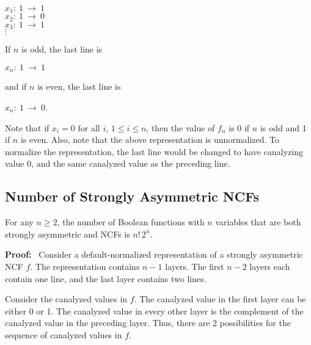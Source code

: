 \smallskip

\noindent
\hspace*{0.5in}
$x_1:~ 1 ~\longrightarrow~ 1$ \\
\hspace*{0.5in}
$x_2:~ 1 ~\longrightarrow~ 0$ \\
\hspace*{0.5in}
$x_3:~ 1 ~\longrightarrow~ 1$ \\
\hspace*{0.75in}
$\vdots$ 

\noindent
If $n$ is odd, the last line is 

\noindent
\hspace*{0.5in}
$x_n:~ 1 ~\longrightarrow~ 1$ 

\noindent
and if $n$ is even, the last line is 

\noindent
\hspace*{0.5in}
$x_n:~ 1 ~\longrightarrow~ 0$. 

\smallskip

\noindent
Note that if $x_i = 0$ for all $i$, $1 \leq i \leq n$, then the
value of $f_n$ is 0 if $n$ is odd and 1 if $n$ is even.  Also, note
that the above representation is unnormalized. To normalize the
representation, the last line would be changed to have canalyzing
value 0, and the same canalyzed value as the preceding line.

\subsection{Number of Strongly Asymmetric NCFs}
\label{sse:number_strongly_asymmetric}

\begin{theorem}\label{thm:count_strongly_asymmetric}
For any $n \geq 2$, the number of Boolean functions with $n$ variables 
that are both strongly asymmetric and NCFs is $n! \, 2^n$.
\end{theorem}

\noindent
\textbf{Proof:}~
Consider a default-normalized representation of a strongly asymmetric NCF $f$.
The representation contains $n-1$ layers.
The first $n-2$ layers each contain one line, and the last layer contains two lines.

Consider the canalyzed values in $f$. The canalyzed value in the
first layer can be either 0 or 1.  The canalyzed value in every
other layer is the complement of the canalyzed value in the preceding
layer.  Thus, there are 2 possibilities for the sequence of canalyzed
values in $f$.

